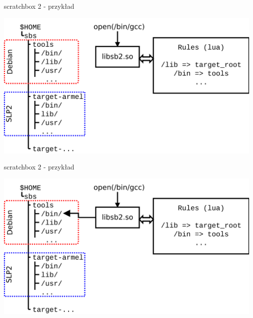 \documentclass[presentation,aspectratio=43,12pt]{beamer}
\begin{document}
\begin{frame}[label=sec-5-6]{scratchbox 2 - przykład}
\begin{center}
\includegraphics[width=\textwidth]{images/sb2-1}
\end{center}
\end{frame}
\begin{frame}[label=sec-5-7]{scratchbox 2 - przykład}
\begin{center}
\includegraphics[width=\textwidth]{images/sb2-2}
\end{center}
\end{frame}
\end{document}
